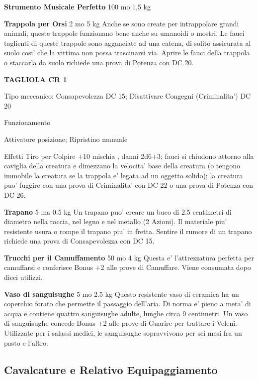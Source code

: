 \documentclass[a4paper,11pt,twoside,openany]{book}
\begin{document}
{\textbf{Strumento Musicale Perfetto} 100 mo 1,5 kg

\textbf{Trappola per Orsi} 2 mo 5 kg Anche se sono create per intrappolare grandi animali, queste trappole funzionano bene anche su umanoidi o mostri. Le fauci taglienti di queste trappole sono agganciate ad una catena, di solito assicurata al suolo cosi' che la vittima non possa trascinarsi via. Aprire le fauci della trappola o staccarla da suolo richiede una prova di Potenza con DC 20.

\textbf{TAGLIOLA CR 1}

Tipo meccanico; Consapevolezza DC 15; Disattivare Congegni (Criminalita') DC 20

Funzionamento

Attivatore posizione; Ripristino manuale

Effetti Tiro per Colpire +10 mischia , danni 2d6+3; fauci si chiudono attorno alla caviglia della creatura e dimezzano la velocita' base della creatura (o tengono immobile la creatura se la trappola e' legata ad un oggetto solido); la creatura puo' fuggire con una prova di Criminalita' con DC 22 o una prova di Potenza con DC 26.

\textbf{Trapano} 5 ma 0.5 kg Un trapano puo' creare un buco di 2.5 centimetri di diametro nella roccia, nel legno e nel metallo (2 Azioni). Il materiale piu' resistente usura o rompe il trapano piu' in fretta. Sentire il rumore di un trapano richiede una prova di Consapevolezza con DC 15.

\textbf{Trucchi per il Camuffamento} 50 mo 4 kg Questa e' l'attrezzatura perfetta per camuffarsi e conferisce Bonus +2 alle prove di Camuffare. Viene consumata dopo dieci utilizzi.

\textbf{Vaso di sanguisughe} 5 mo 2.5 kg Questo resistente vaso di ceramica ha un coperchio forato che permette il passaggio dell'aria. Di norma e' pieno a meta' di acqua e contiene quattro sanguisughe adulte, lunghe circa 9 centimetri. Un vaso di sanguisughe concede Bonus +2 alle prove di Guarire per trattare i Veleni. Utilizzate per i salassi medici, le sanguisughe sopravvivono per sei mesi fra un pasto e l'altro.

\pagebreak

\subsection{Cavalcature e Relativo Equipaggiamento}

\label{cavalcature-e-relativo-equipaggiamento}

}
\end{document}
